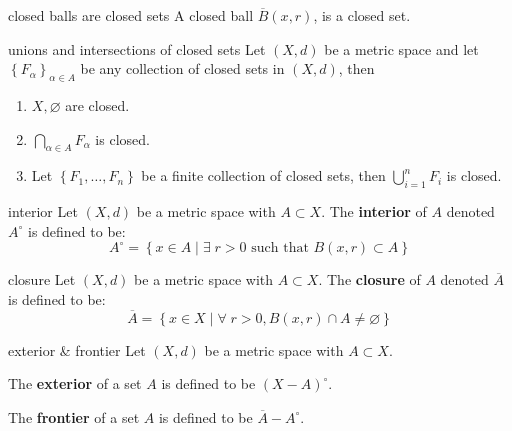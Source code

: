\documentclass[avery5371,grid]{flashcards}
\newcommand{\st}{\textrm{ such that }}
\newcommand{\setst}{\; | \;}
\begin{document}
\begin{flashcard}[Proposition]{closed balls are closed sets}
A closed ball $\overline{B}(x,r)$, is a closed set.
\end{flashcard}

\begin{flashcard}[Theorem]{unions and intersections of closed sets}
Let $(X,d)$ be a metric space and let $\left\{F_{\alpha}\right\}_{\alpha \in A}$ be any
collection of closed sets in $(X,d)$, then
\begin{enumerate}
 \item $X,\varnothing$ are closed.
 \item $\bigcap_{\alpha \in A} F_{\alpha}$ is closed.
 \item Let $\left\{F_1, \ldots , F_n\right\}$ be a finite collection of
 closed sets, then $\bigcup^{n}_{i=1}F_i$ is closed.
\end{enumerate}
\end{flashcard}

\begin{flashcard}[Definition]{interior}
Let $(X,d)$ be a metric space with $A \subset X$.  The \mbox{\textbf{interior}}
of $A$ denoted $A^{\circ}$  is defined to be:
\begin{equation*}
A^{\circ} = \left\{ x \in A \setst \exists \; r>0 \st B(x,r) \subset A \right\}
\end{equation*}
\end{flashcard}

\begin{flashcard}[Definition]{closure}
Let $(X,d)$ be a metric space with $A \subset X$.  The \mbox{\textbf{closure}}
of $A$ denoted $\overline{A}$  is defined to be:
\begin{equation*}
\overline{A} = \left\{ x \in X \setst \forall \; r>0, B(x,r) \cap A
\neq \varnothing\right\}
\end{equation*}
\end{flashcard}

\begin{flashcard}[Definition]{exterior \& frontier}
Let $(X,d)$ be a metric space with $A \subset X$.

\bigskip
The \mbox{\textbf{exterior}} of a set $A$ is defined to be $(X-A)^{\circ}$.

\bigskip
The \mbox{\textbf{frontier}} of a set $A$ is defined to be $\overline{A}-A^{\circ}$.
\end{flashcard}
\end{document}
